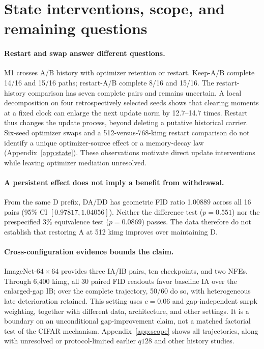 \section{State interventions, scope, and remaining questions}
\label{sec:scope}
\paragraph{Restart and swap answer different questions.}
M1 crosses A/B history with optimizer retention or restart. Keep-A/B complete 14/16 and 15/16 paths; restart-A/B complete 8/16 and 15/16. The restart-history comparison has seven complete pairs and remains uncertain. A local decomposition on four retrospectively selected seeds shows that clearing moments at a fixed clock can enlarge the next update norm by 12.7--14.7 times. Restart thus changes the update process, beyond deleting a putative historical carrier. Six-seed optimizer swaps and a 512-versus-768-kimg restart comparison do not identify a unique optimizer-source effect or a memory-decay law (Appendix~\ref{app:state}). These observations motivate direct update interventions while leaving optimizer mediation unresolved.

\paragraph{A persistent effect does not imply a benefit from withdrawal.}
From the same D prefix, DA/DD has geometric FID ratio 1.00889 across all 16 pairs (95\% CI $[0.97817,1.04056]$). Neither the difference test ($p=0.551$) nor the prespecified 3\% equivalence test ($p=0.0869$) passes. The data therefore do not establish that restoring A at 512 kimg improves over maintaining D.

\paragraph{Cross-configuration evidence bounds the claim.}
ImageNet-$64\times64$ provides three IA/IB pairs, ten checkpoints, and two NFEs. Through 6,400 kimg, all 30 paired FID readouts favor baseline IA over the enlarged-gap IB; over the complete trajectory, 50/60 do so, with heterogeneous late deterioration retained. This setting uses $c=0.06$ and gap-independent snrpk weighting, together with different data, architecture, and other settings. It is a boundary on an unconditional gap-improvement claim, not a matched factorial test of the CIFAR mechanism. Appendix~\ref{app:scope} shows all trajectories, along with unresolved or protocol-limited earlier $q128$ and other history studies.

